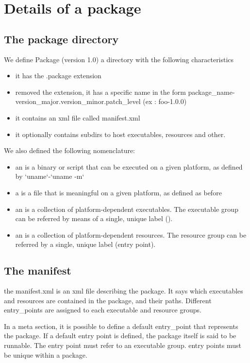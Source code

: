 \section{Details of a package}

\subsection{The package directory}

We define Package (version 1.0) a directory with the following characteristics

\begin{itemize}
\item it has the .package extension
\item removed the extension, it has a specific name in the form package\_name-version\_major.version\_minor.patch\_level (ex : foo-1.0.0)
\item it contains an xml file called manifest.xml
\item it optionally contains subdirs to host executables, resources and other.
\end{itemize}

We also defined the following nomenclature:
\begin{itemize}
\item an  is a binary or script that can be executed on a given platform, as defined by `uname`-`uname -m`
\item a  is a file that is meaningful on a given platform, as defined as before
\item an  is a collection of platform-dependent executables. The executable group can be referred by means of a single, unique label ().
\item an  is a collection of platform-dependent resources. The resource group can be referred by a single, unique label (entry point).
\end{itemize}

\subsection{The manifest}

the manifest.xml is an xml file describing the package. It says which
executables and resources are contained in the package, and their paths.
Different entry\_points are assigned to each executable and resource groups.

In a meta section, it is possible to define a default entry\_point that
represents the package. If a default entry point is defined, the package itself
is said to be runnable. The entry point must refer to an executable group.
entry points must be unique within a package.

